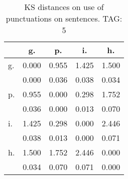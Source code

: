 \begin{table}[h!]
\begin{center}
\begin{tabular}{| l | c | c | c | c |}\hline
 & g. & p. & i. & h. \\\hline
g. & 0.000  & 0.955  & 1.425  & 1.500 \\\hline
 & 0.000  & 0.036  & 0.038  & 0.034 \\\hline
p. & 0.955  & 0.000  & 0.298  & 1.752 \\\hline
 & 0.036  & 0.000  & 0.013  & 0.070 \\\hline
i. & 1.425  & 0.298  & 0.000  & 2.446 \\\hline
 & 0.038  & 0.013  & 0.000  & 0.071 \\\hline
h. & 1.500  & 1.752  & 2.446  & 0.000 \\\hline
 & 0.034  & 0.070  & 0.071  & 0.000 \\\hline
\end{tabular}
\caption{KS distances on use of punctuations on sentences. TAG: 5}
\end{center}
\end{table}
